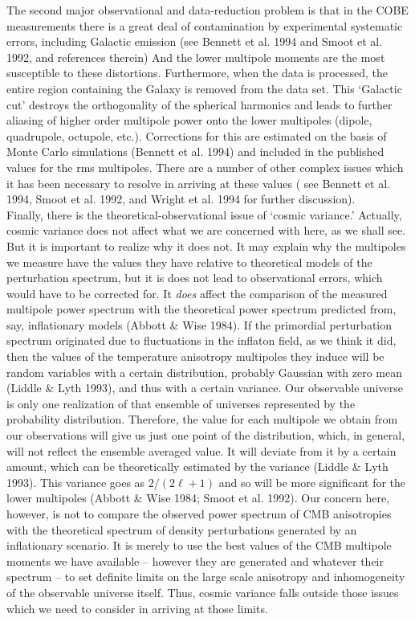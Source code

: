 The second major observational and data-reduction problem is that in the
COBE measurements there is
a great deal of contamination by experimental systematic errors, including
Galactic emission (see Bennett et al. 1994  and Smoot et al. 1992, and
references therein) And the lower
multipole moments are the most susceptible to these distortions. Furthermore,
when the data is processed, the entire region containing the Galaxy is removed
from the data set. This `Galactic cut' destroys the orthogonality of the
spherical harmonics and leads to further aliasing of higher order multipole
power onto the lower multipoles (dipole, quadrupole, octupole, etc.).
Corrections for this are estimated on the basis of Monte Carlo simulations 
(Bennett et al. 1994)
and included in the published values for the rms multipoles. There are 
a number of other complex issues which it has been necessary to resolve in
arriving at these values ( see Bennett et al. 1994, Smoot et al. 1992, and
Wright et al. 1994 for further discussion). \\

Finally, there is the theoretical-observational issue of `cosmic variance.' 
Actually, cosmic variance does not affect what we are concerned with
here, as we shall see. But it is important to realize why it does not. It may
explain why the multipoles we measure have the values they have relative to
theoretical models of the perturbation spectrum, but it is
does not lead to observational errors, which would have to be corrected for. It
{\it does} affect the comparison of the measured multipole power
spectrum with the theoretical power spectrum predicted from, say, inflationary
models (Abbott \& Wise 1984). If the primordial perturbation spectrum
originated due to 
fluctuations in the inflaton field, as we think it did, then the values of
the temperature anisotropy  multipoles they induce will be random variables
with a certain distribution, probably Gaussian with zero mean (Liddle \& Lyth
1993), and thus
with a
certain variance. Our observable universe is only one realization of that
ensemble of universes represented by the probability distribution. Therefore, 
the value for each multipole we obtain from our observations will give us just
one point of the distribution, which, in general, will not reflect the
ensemble averaged value. It will deviate from it by a certain amount, which
can be theoretically estimated by the variance (Liddle \& Lyth 1993). This
variance goes as $2/(2 \ell + 1)$ and so will be more significant for the 
lower multipoles (Abbott \& Wise 1984; Smoot et al. 1992).  Our concern 
here, however, is not to compare the observed power spectrum of CMB 
anisotropies with the theoretical spectrum of density perturbations
generated by an inflationary scenario. It is merely to use the best values
of the CMB multipole moments we have available -- however they are generated
and whatever their spectrum -- to set definite limits on the large scale
anisotropy and inhomogeneity of the observable universe itself. 
Thus, cosmic variance falls outside those issues which we need to 
consider in arriving at those limits. \\

